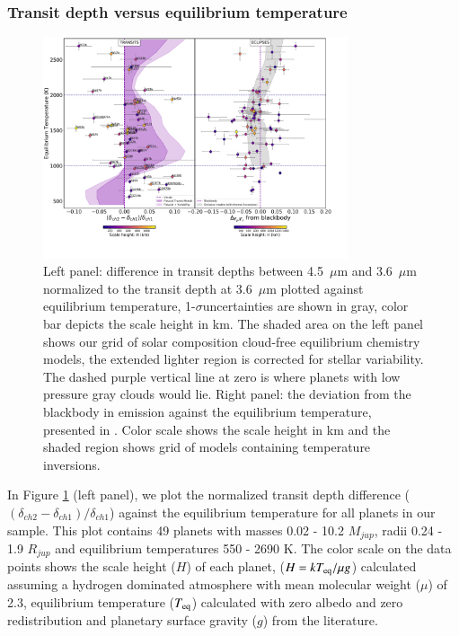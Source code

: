 \subsubsection{Transit depth versus equilibrium temperature}
\label{P1:subsec:TDvsTeq}

\begin{figure}
    \centering
    \includegraphics[trim={0 4cm 0 0},clip, width=0.8\textwidth]{UltimatePaperPlot_PHOENIX_intpl.pdf}
    \caption{Left panel: difference in transit depths between 4.5~$\mu$m and 3.6~$\mu$m normalized to the transit depth at 3.6~$\mu$m plotted against equilibrium temperature, 1-$\sigma$uncertainties are shown in gray, color bar depicts the scale height in km. The shaded area on the left panel shows our grid of solar composition cloud-free equilibrium chemistry models, the extended lighter region is corrected for stellar variability. The dashed purple vertical line at zero is where planets with low pressure gray clouds would lie. Right panel: the deviation from the blackbody in emission against the equilibrium temperature, presented in \citet{Baxter2020}. Color scale shows the scale height in km and the shaded region shows grid of models containing temperature inversions.}
    \label{P1:fig:ultimateplot}
\end{figure}

In Figure \ref{P1:fig:ultimateplot} (left panel), we plot the normalized transit depth difference ($(\delta_{ch2} - \delta_{ch1}) / \delta_{ch1}$) against the equilibrium temperature for all planets in our sample. This plot contains 49 planets with masses 0.02 - 10.2 $M_{jup}$, radii 0.24 - 1.9 $R_{jup}$ and equilibrium temperatures 550 - 2690 K. The color scale on the data points shows the scale height ($H$) of each planet, ($H = kT_{\rm eq}/\mu g$) calculated assuming a hydrogen dominated atmosphere with mean molecular weight ($\mu$) of 2.3, equilibrium temperature ($T_{\rm eq}$) calculated with zero albedo and zero redistribution and planetary surface gravity ($g$) from the literature.

